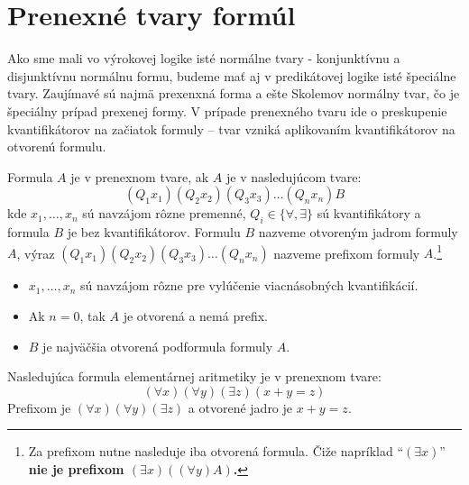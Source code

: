 
\section{Prenexné tvary formúl}

Ako sme mali vo výrokovej logike isté normálne tvary - konjunktívnu a
disjunktívnu normálnu formu, budeme mať aj v predikátovej logike isté
špeciálne tvary. Zaujímavé sú najmä prexenxná forma a ešte Skolemov
normálny tvar, čo je špeciálny prípad prexenej formy.
V prípade prenexného tvaru ide o preskupenie kvantifikátorov na
začiatok formuly -- tvar vzniká aplikovaním kvantifikátorov na otvorenú
formulu.


\begin{definicia}
    Formula $A$ je v prenexnom tvare, ak $A$ je v nasledujúcom tvare:
    \begin{equation*}
     (Q_1 x_1) (Q_2 x_2) (Q_3 x_3) \dots (Q_n x_n) B
    \end{equation*}
    kde $x_1, \dots , x_n$ sú navzájom rôzne premenné,
    $Q_i \in\{\forall, \exists\}$ sú
    kvantifikátory a  formula $B$ je bez kvantifikátorov.
    Formulu $B$ nazveme otvoreným jadrom formuly $A$, 
    výraz $(Q_1 x_1) (Q_2 x_2) (Q_3 x_3) \dots (Q_n x_n)$ nazveme
    prefixom formuly $A$.\footnote{Za prefixom nutne nasleduje
    iba otvorená formula. Čiže napríklad ``$(\exists x)$'' 
    \bf{nie je} prefixom $(\exists x)(
    (\forall y) A)$.
    }
\end{definicia}

\begin{poznamka}
    \noindent
    \begin{itemize}
     \item $x_1, \dots, x_n$ sú navzájom rôzne pre vylúčenie viacnásobných
        kvantifikácií.
     \item Ak $n=0$, tak $A$ je otvorená a nemá prefix.
     \item $B$ je najväčšia otvorená podformula formuly $A$.
    \end{itemize}
\end{poznamka}

\begin{priklad}
    Nasledujúca formula elementárnej aritmetiky je v prenexnom tvare:
    \begin{equation*}
        (\forall x) (\forall y) (\exists z) (x+y=z)
    \end{equation*}
    Prefixom je $(\forall x)(\forall y)(\exists z)$ a otvorené jadro
    je $x+y=z$.
\end{priklad}

